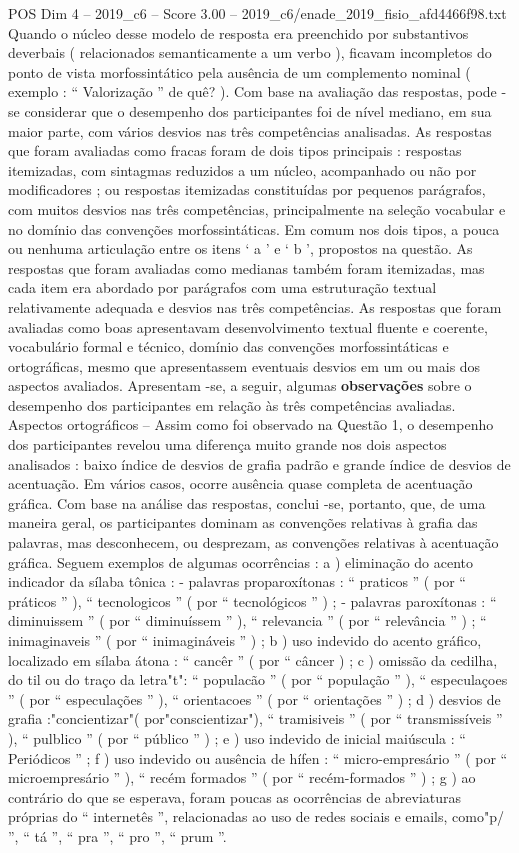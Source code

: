\begin{textsample}{POS Dim 4 – 2019\_c6 – Score 3.00 – 2019\_c6/enade\_2019\_fisio\_afd4466f98.txt}
Quando o núcleo desse modelo de resposta era preenchido por substantivos deverbais ( relacionados semanticamente a um verbo ), ficavam incompletos do ponto de vista morfossintático pela ausência de um complemento nominal ( exemplo : “ Valorização ” de quê? ).
Com base na avaliação das respostas, pode -se considerar que o desempenho dos participantes foi de nível mediano, em sua maior parte, com vários desvios nas três competências analisadas.
As respostas que foram avaliadas como fracas foram de dois tipos principais : respostas itemizadas, com sintagmas reduzidos a um núcleo, acompanhado ou não por modificadores ; ou respostas itemizadas constituídas por pequenos parágrafos, com muitos desvios nas três competências, principalmente na seleção vocabular e no domínio das convenções morfossintáticas.
Em comum nos dois tipos, a pouca ou nenhuma articulação entre os itens ‘ a ’ e ‘ b ’, propostos na questão.
As respostas que foram avaliadas como medianas também foram itemizadas, mas cada item era abordado por parágrafos com uma estruturação textual relativamente adequada e desvios nas três competências.
As respostas que foram avaliadas como boas apresentavam desenvolvimento textual fluente e coerente, vocabulário formal e técnico, domínio das convenções morfossintáticas e ortográficas, mesmo que apresentassem eventuais desvios em um ou mais dos aspectos avaliados.
Apresentam -se, a seguir, algumas \textbf{observações} sobre o desempenho dos participantes em relação às três competências avaliadas.
Aspectos ortográficos – Assim como foi observado na Questão 1, o desempenho dos participantes revelou uma diferença muito grande nos dois aspectos analisados : baixo índice de desvios de grafia padrão e grande índice de desvios de acentuação.
Em vários casos, ocorre ausência quase completa de acentuação gráfica.
Com base na análise das respostas, conclui -se, portanto, que, de uma maneira geral, os participantes dominam as convenções relativas à grafia das palavras, mas desconhecem, ou desprezam, as convenções relativas à acentuação gráfica.
Seguem exemplos de algumas ocorrências : a ) eliminação do acento indicador da sílaba tônica : - palavras proparoxítonas : “ praticos ” ( por “ práticos ” ), “ tecnologicos ” ( por “ tecnológicos ” ) ; - palavras paroxítonas : “ diminuissem ” ( por “ diminuíssem ” ), “ relevancia ” ( por “ relevância ” ) ; “ inimaginaveis ” ( por “ inimagináveis ” ) ; b ) uso indevido do acento gráfico, localizado em sílaba átona : “ cancêr ” ( por “ câncer ) ; c ) omissão da cedilha, do til ou do traço da letra"t": “ populacão ” ( por “ população ” ), “ especulaçoes ” ( por “ especulações ” ), “ orientacoes ” ( por “ orientações ” ) ; d ) desvios de grafia :"concientizar"( por"conscientizar"), “ tramisiveis ” ( por “ transmissíveis ” ), “ pulblico ” ( por “ público ” ) ; e ) uso indevido de inicial maiúscula : “ Periódicos ” ; f ) uso indevido ou ausência de hífen : “ micro-empresário ” ( por “ microempresário ” ), “ recém formados ” ( por “ recém-formados ” ) ; g ) ao contrário do que se esperava, foram poucas as ocorrências de abreviaturas próprias do “ internetês ”, relacionadas ao uso de redes sociais e emails, como"p/ ”, “ tá ”, “ pra ”, “ pro ”, “ prum ”.

\end{textsample}
